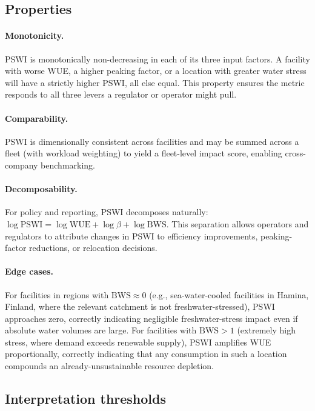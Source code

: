 \documentclass[conference,10pt]{IEEEtran}
\begin{document}
\subsection{Properties}

\paragraph{Monotonicity.}
PSWI is monotonically non-decreasing in each of its three input
factors. A facility with worse WUE, a higher peaking factor, or a
location with greater water stress will have a strictly higher PSWI,
all else equal. This property ensures the metric responds to all three
levers a regulator or operator might pull.

\paragraph{Comparability.}
PSWI is dimensionally consistent across facilities and may be summed
across a fleet (with workload weighting) to yield a fleet-level impact
score, enabling cross-company benchmarking.

\paragraph{Decomposability.}
For policy and reporting, PSWI decomposes naturally:
$\log\textrm{PSWI} = \log\textrm{WUE} + \log\beta + \log\textrm{BWS}$.
This separation allows operators and regulators to attribute changes in
PSWI to efficiency improvements, peaking-factor reductions, or
relocation decisions.

\paragraph{Edge cases.}
For facilities in regions with $\textrm{BWS} \approx 0$ (e.g.,
sea-water-cooled facilities in Hamina, Finland, where the relevant
catchment is not freshwater-stressed), PSWI approaches zero, correctly
indicating negligible freshwater-stress impact even if absolute water
volumes are large. For facilities with $\textrm{BWS} > 1$ (extremely
high stress, where demand exceeds renewable supply), PSWI amplifies
WUE proportionally, correctly indicating that any consumption in such a
location compounds an already-unsustainable resource depletion.

\subsection{Interpretation thresholds}
\end{document}
